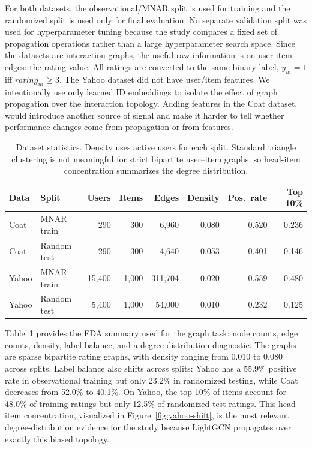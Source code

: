 \documentclass[10pt]{article}
\begin{document}
For both datasets, the observational/MNAR split is used for training and the randomized split is used only for final evaluation. No separate validation split was used for hyperparameter tuning because the study compares a fixed set of propagation operations rather than a large hyperparameter search space. Since the datasets are interaction graphs, the useful raw information is on user-item edges: the rating value. All ratings are converted to the same binary label, $y_{ui}=1$ iff $rating_{ui}\ge3$. The Yahoo dataset did not have user/item features. We intentionally use only learned ID embeddings to isolate the effect of graph propagation over the interaction topology. Adding features in the Coat dataset, would introduce another source of signal and make it harder to tell whether performance changes come from propagation or from features.



\begin{table}[t]
\centering
\small
\caption{Dataset statistics. Density uses active users for each split. Standard triangle clustering is not meaningful for strict bipartite user--item graphs, so head-item concentration summarizes the degree distribution.}
\label{tab:data}
\begin{tabular}{llrrrrrr}
\toprule
Data & Split & Users & Items & Edges & Density & Pos.\ rate & Top 10\% \\
\midrule
Coat & MNAR train & 290 & 300 & 6{,}960 & 0.080 & 0.520 & 0.236 \\
Coat & Random test & 290 & 300 & 4{,}640 & 0.053 & 0.401 & 0.146 \\
Yahoo & MNAR train & 15{,}400 & 1{,}000 & 311{,}704 & 0.020 & 0.559 & 0.480 \\
Yahoo & Random test & 5{,}400 & 1{,}000 & 54{,}000 & 0.010 & 0.232 & 0.125 \\
\bottomrule
\end{tabular}
\end{table}

Table~\ref{tab:data} provides the EDA summary used for the graph task: node counts, edge counts, density, label balance, and a degree-distribution diagnostic. The graphs are sparse bipartite rating graphs, with density ranging from 0.010 to 0.080 across splits. Label balance also shifts across splits: Yahoo has a 55.9\% positive rate in observational training but only 23.2\% in randomized testing, while Coat decreases from 52.0\% to 40.1\%. On Yahoo, the top 10\% of items account for 48.0\% of training ratings but only 12.5\% of randomized-test ratings. This head-item concentration, visualized in Figure~\ref{fig:yahoo-shift}, is the most relevant degree-distribution evidence for the study because LightGCN propagates over exactly this biased topology.
\end{document}
